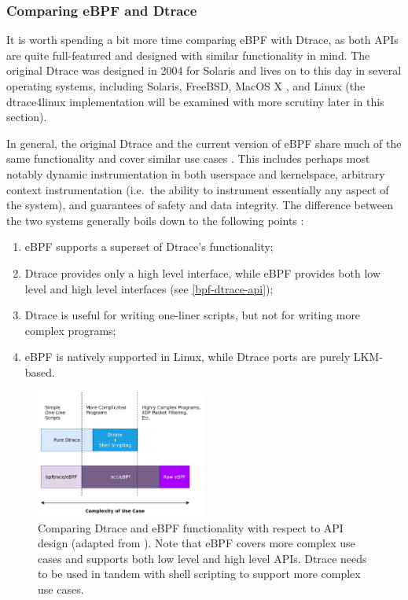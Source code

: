 \documentclass[
  12pt]{findlay}
\providecommand{\tightlist}{\setlength{\itemsep}{0pt}\setlength{\parskip}{0pt}}
\begin{document}
\hypertarget{comparing-ebpf-and-dtrace}{%
\subsubsection{Comparing eBPF and
Dtrace}\label{comparing-ebpf-and-dtrace}}

It is worth spending a bit more time comparing eBPF with Dtrace, as both
APIs are quite full-featured and designed with similar functionality in
mind. The original Dtrace \autocite{cantrill04} was designed in 2004 for
Solaris and lives on to this day in several operating systems, including
Solaris, FreeBSD, MacOS X \autocite{gregg14}, and Linux
\autocite{dtrace4linux} (the dtrace4linux implementation will be
examined with more scrutiny later in this section).

In general, the original Dtrace and the current version of eBPF share
much of the same functionality and cover similar use cases
\autocite{cantrill04,starovoitov13,starovoitov14}. This includes perhaps
most notably dynamic instrumentation in both userspace and kernelspace,
arbitrary context instrumentation (i.e.~the ability to instrument
essentially any aspect of the system), and guarantees of safety and data
integrity. The difference between the two systems generally boils down
to the following points \autocite{gregg14,gregg19bpf}:

\begin{enumerate}
\def\labelenumi{\arabic{enumi})}
\tightlist
\item
  eBPF supports a superset of Dtrace's functionality;
\item
  Dtrace provides only a high level interface, while eBPF provides both
  low level and high level interfaces (see \autoref{bpf-dtrace-api});
\item
  Dtrace is useful for writing one-liner scripts, but not for writing
  more complex programs;
\item
  eBPF is natively supported in Linux, while Dtrace ports are purely
  LKM-based.
\end{enumerate}

\begin{figure}
\includegraphics[width=0.5\textwidth]{../figures/bpf-dtrace-api.png}
\caption[Comparing Dtrace and eBPF functionality with respect to API design]
{
Comparing Dtrace and eBPF functionality with respect to API design (adapted from \cite{gregg18}).
Note that eBPF covers more complex use cases and supports both low level
and high level APIs. Dtrace needs to be used in tandem with shell
scripting to support more complex use cases.
}
\label{bpf-dtrace-api}
\end{figure}
\end{document}
